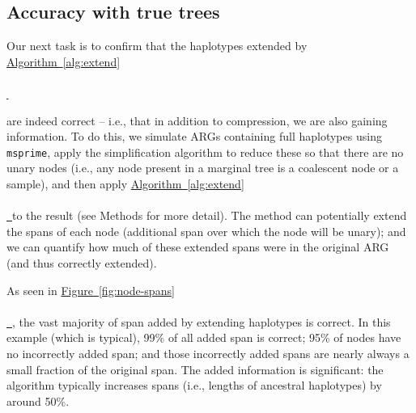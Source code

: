 \documentclass[10pt,twoside,lineno]{gsajnl}
\newcommand{\msprime}{\texttt{msprime}}
\newcommand{\algorithmref}[2][]{%
	\hyperref[{#2}]{%
		Algorithm~\ref*{#2}%
		\ifx\\#1\\%
		\else
		\,#1%
		\fi
	}%
}
\newcommand*{\figref}[2][]{%
	\hyperref[{#2}]{%
		Figure~\ref*{#2}%
		\ifx\\#1\\%
		\else
		\,#1%
		\fi
	}%
}
\begin{document}
\subsection{Accuracy with true trees}


Our next task is to confirm that the haplotypes extended by \algorithmref{alg:extend}
are indeed correct -- i.e., that in addition to compression, we are also gaining information.
To do this, 
we simulate ARGs containing full haplotypes using \msprime{},
apply the simplification algorithm to reduce these so that there are no unary nodes
(i.e., any node present in a marginal tree is a coalescent node or a sample),
and then apply \algorithmref{alg:extend} to the result
(see Methods for more detail).
The method can potentially extend the spans of each node
(additional span over which the node will be unary);
and we can quantify how much of these extended spans were in the original ARG
(and thus correctly extended).

%
%

As seen in \figref{fig:node-spans},
the vast majority of span added by extending haplotypes is correct.
In this example (which is typical),
99\% of all added span is correct;
95\% of nodes have no incorrectly added span;
and those incorrectly added spans are nearly always a small fraction of the original span.
The added information is significant:
the algorithm typically increases spans (i.e., lengths of ancestral haplotypes)
by around 50\%.
\end{document}
